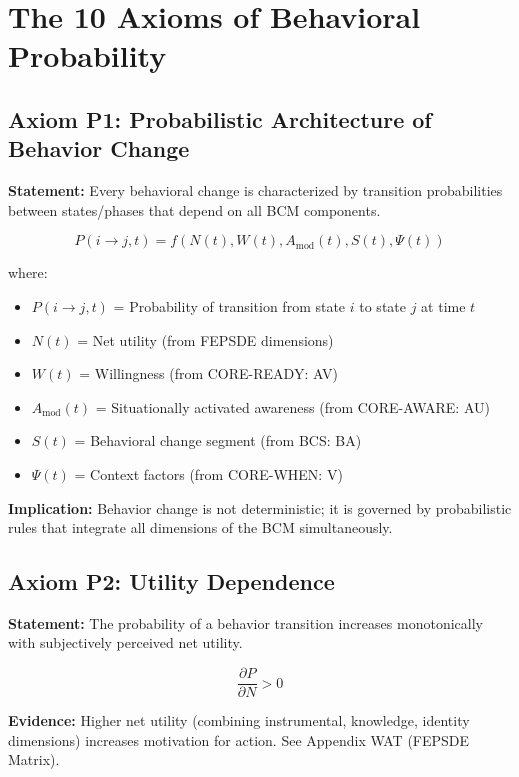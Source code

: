 \documentclass[11pt, a4paper]{article}
\begin{document}
\section{The 10 Axioms of Behavioral Probability}

\subsection{Axiom P1: Probabilistic Architecture of Behavior Change}

\textbf{Statement:} Every behavioral change is characterized by transition probabilities between states/phases that depend on all BCM components.

\begin{equation}
P(i \to j, t) = f(N(t), W(t), A_{\text{mod}}(t), S(t), \Psi(t))
\end{equation}

where:
\begin{itemize}[nosep]
    \item $P(i \to j, t)$ = Probability of transition from state $i$ to state $j$ at time $t$
    \item $N(t)$ = Net utility (from FEPSDE dimensions)
    \item $W(t)$ = Willingness (from CORE-READY: AV)
    \item $A_{\text{mod}}(t)$ = Situationally activated awareness (from CORE-AWARE: AU)
    \item $S(t)$ = Behavioral change segment (from BCS: BA)
    \item $\Psi(t)$ = Context factors (from CORE-WHEN: V)
\end{itemize}

\textbf{Implication:} Behavior change is not deterministic; it is governed by probabilistic rules that integrate all dimensions of the BCM simultaneously.

\subsection{Axiom P2: Utility Dependence}

\textbf{Statement:} The probability of a behavior transition increases monotonically with subjectively perceived net utility.

\begin{equation}
\frac{\partial P}{\partial N} > 0
\end{equation}

\textbf{Evidence:} Higher net utility (combining instrumental, knowledge, identity dimensions) increases motivation for action. See Appendix WAT (FEPSDE Matrix).
\end{document}
